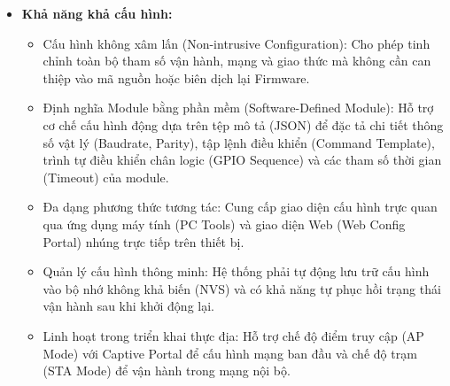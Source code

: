 \begin{itemize}
            \item \textbf{Khả năng khả cấu hình:}
            \begin{itemize}
                \item Cấu hình không xâm lấn (Non-intrusive Configuration): Cho phép tinh chỉnh toàn bộ tham số vận hành, mạng và giao thức mà không cần can thiệp vào mã nguồn hoặc biên dịch lại Firmware.
                \item Định nghĩa Module bằng phần mềm (Software-Defined Module): Hỗ trợ cơ chế cấu hình động dựa trên tệp mô tả (JSON) để đặc tả chi tiết thông số vật lý (Baudrate, Parity), tập lệnh điều khiển (Command Template), trình tự điều khiển chân logic (GPIO Sequence) và các tham số thời gian (Timeout) của module.
                \item Đa dạng phương thức tương tác: Cung cấp giao diện cấu hình trực quan qua ứng dụng máy tính (PC Tools) và giao diện Web (Web Config Portal) nhúng trực tiếp trên thiết bị.
                \item Quản lý cấu hình thông minh: Hệ thống phải tự động lưu trữ cấu hình vào bộ nhớ không khả biến (NVS) và có khả năng tự phục hồi trạng thái vận hành sau khi khởi động lại.
                \item Linh hoạt trong triển khai thực địa: Hỗ trợ chế độ điểm truy cập (AP Mode) với Captive Portal để cấu hình mạng ban đầu và chế độ trạm (STA Mode) để vận hành trong mạng nội bộ.
            \end{itemize}
        \end{itemize}

